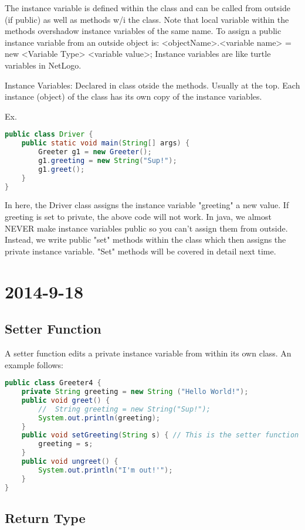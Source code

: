 \documentclass [12 pt, twoside] {article}
\begin{document}
The instance variable is defined within the class and can be called from outside (if public) as well as methods w/i the class.
Note that local variable within the methods overshadow instance variables of the same name.
To assign a public instance variable from an outside object is: <objectName>.<variable name> = new <Variable Type> <variable value>;
Instance variables are like turtle variables in NetLogo.


Instance Variables: Declared in class otside the methods. Usually at the top.
Each instance (object) of the class has its own copy of the instance variables.


Ex.
\begin{lstlisting}[language=java]
public class Driver {
	public static void main(String[] args) {
		Greeter g1 = new Greeter();
		g1.greeting = new String("Sup!");
		g1.greet();
	}
}
\end{lstlisting}


In here, the Driver class assigns the instance variable "greeting" a new value.
If greeting is set to private, the above code will not work.
In java, we almost NEVER make instance variables public so you can't assign them from outside.
Instead, we write public "set" methods within the class which then assigns the private instance variable.
"Set" methods will be covered in detail next time.


\section{2014-9-18}
\subsection{Setter Function}


A setter function edits a private instance variable from within its own class.
An example follows:
\begin{lstlisting}[language=java]
public class Greeter4 {
	private String greeting = new String ("Hello World!");
	public void greet() {
		//	String greeting = new String("Sup!");
		System.out.println(greeting);
	}
	public void setGreeting(String s) { // This is the setter function
		greeting = s;
	}
	public void ungreet() {
		System.out.println("I'm out!'");	
	}
}
\end{lstlisting}


\subsection{Return Type}
\end{document}
